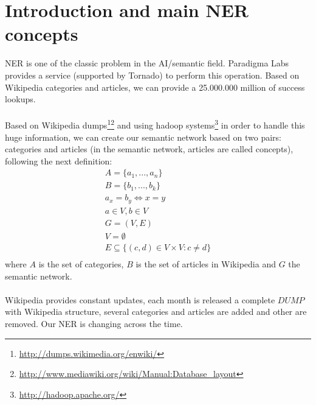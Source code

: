 \documentclass[a4paper,11pt]{article}
\begin{document}
\section{Introduction and main NER concepts}
NER is one of the classic problem in the AI/semantic field. Paradigma Labs provides a service (supported by Tornado) to perform this operation. Based on Wikipedia categories and articles, we can provide a 25.000.000 million of success lookups. 
\\
\\
Based on Wikipedia dumps\footnote{\url{http://dumps.wikimedia.org/enwiki/}}\footnote{\url{http://www.mediawiki.org/wiki/Manual:Database\_layout}} and using hadoop systems\footnote{\url{http://hadoop.apache.org/}} in order to handle this huge information, we can create our semantic network based on two pairs: categories and articles (in the semantic network, articles are called concepts), following the next definition:
\begin{equation}
\begin{array}{l}
\displaystyle A = \{a_1 , ... , a_n\} \\
\displaystyle B = \{b_1 , ... , b_k\} \\
\displaystyle a_x = b_y \Leftrightarrow x = y \\
\displaystyle a \in V, \displaystyle b \in V
\\
\displaystyle G=(V , E) \\
\displaystyle V = \emptyset \\
\displaystyle E \subseteq \{(c,d) \in V\times V : c \neq d \} \\
\end{array}
\end{equation}
where $A$ is the set of categories, $B$ is the set of articles in Wikipedia and $G$ the semantic network.
\\
\\
Wikipedia provides constant updates, each month is released a complete $DUMP$ with Wikipedia structure, several categories and articles are added and other are removed. Our NER is changing across the time.
\end{document}
